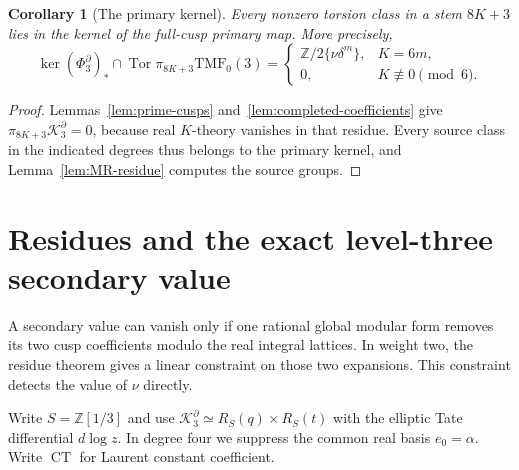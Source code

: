 \documentclass[11pt,a4paper]{amsart}
\newcommand{\Z}{\mathbb Z}
\newcommand{\TMF}{\mathrm{TMF}}
\newcommand{\Tor}{\operatorname{Tor}}
\newcommand{\cK}{\mathcal K}
\theoremstyle{plain}
\newtheorem{corollary}[theorem]{Corollary}
\theoremstyle{definition}
\theoremstyle{remark}
\begin{document}
\begin{corollary}[The primary kernel]\label{cor:primary-kernel}
Every nonzero torsion class in a stem $8K+3$ lies in the kernel of the full-cusp primary map.
More precisely,
\[
 \ker(\Phi_3^\partial)_*\cap\Tor\pi_{8K+3}\TMF_0(3)
 =\begin{cases}
 \Z/2\{\nu\delta^m\},&K=6m,\\
 0,&K\not\equiv0\pmod6.
 \end{cases}
\]
\end{corollary}

\begin{proof}
Lemmas~\ref{lem:prime-cusps} and~\ref{lem:completed-coefficients}
give $\pi_{8K+3}\cK_3^\partial=0$, because real $K$-theory vanishes
in that residue. Every source class in the indicated degrees thus
belongs to the primary kernel, and Lemma~\ref{lem:MR-residue}
computes the source groups.
\end{proof}

\section{Residues and the exact level-three secondary value}\label{sec:residue}

A secondary value can vanish only if one rational global modular
form removes its two cusp coefficients modulo the real integral
lattices. In weight two, the residue theorem gives a linear
constraint on those two expansions. This constraint detects the
value of $\nu$ directly.

Write $S=\Z[1/3]$ and use
$\cK_3^\partial\simeq R_S(q)\times R_S(t)$ with the elliptic
Tate differential $d\log z$. In degree four we suppress the common
real basis $e_0=\alpha$. Write $\operatorname{CT}$ for Laurent
constant coefficient.
\end{document}
